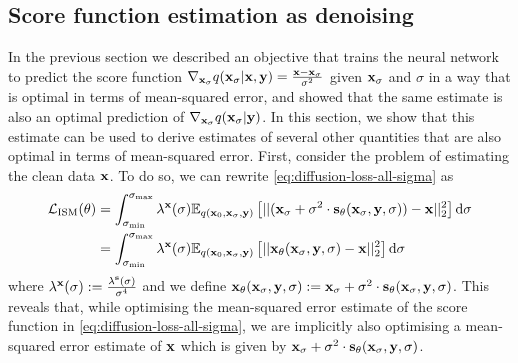 \subsection{Score function estimation as denoising} \label{eq:diffusion-equivalent-parameterisations}
In the previous section we described an objective that trains the neural network to predict the score function $\nabla_{{\mathbf{x}}_\sigma} q({\mathbf{x}}_\sigma|{\mathbf{x}},{\mathbf{y}}) = \frac{{\mathbf{x}}-{\mathbf{x}}_\sigma}{\sigma^2}$ given ${\mathbf{x}}_\sigma$ and $\sigma$ in a way that is optimal in terms of mean-squared error, and showed that the same estimate is also an optimal prediction of $\nabla_{{\mathbf{x}}_\sigma} q({\mathbf{x}}_\sigma|{\mathbf{y}})$. In this section, we show that this estimate can be used to derive estimates of several other quantities that are also optimal in terms of mean-squared error. First, consider the problem of estimating the clean data ${\mathbf{x}}$. To do so, we can rewrite \cref{eq:diffusion-loss-all-sigma} as
\begin{align} \label{eq:x0-diffusion-loss}
    \mathcal{L}_\text{ISM}(\theta) &= \int_{\sigma_\text{min}}^{\sigma_\text{max}} \lambda^{\mathbf{x}}(\sigma) \mathbb{E}_{q({\mathbf{x}}_0, {\mathbf{x}}_\sigma, {\mathbf{y}})} \left[ 
    || ({\mathbf{x}}_\sigma + \sigma^2 \cdot {\mathbf{s}}_\theta({\mathbf{x}}_\sigma, {\mathbf{y}}, \sigma)) - {\mathbf{x}} ||_2^2 \right] \mathrm{d}\sigma \\
    &= \int_{\sigma_\text{min}}^{\sigma_\text{max}} \lambda^{\mathbf{x}}(\sigma) \mathbb{E}_{q({\mathbf{x}}_0, {\mathbf{x}}_\sigma, {\mathbf{y}})} \left[ 
    || {\mathbf{x}}_\theta({\mathbf{x}}_\sigma, {\mathbf{y}}, \sigma) - {\mathbf{x}} ||_2^2 \right] \mathrm{d}\sigma
\end{align}
where $\lambda^{\mathbf{x}}(\sigma) := \frac{\lambda^{\mathbf{s}}(\sigma)}{\sigma^4}$ and we define ${\mathbf{x}}_\theta({\mathbf{x}}_\sigma, {\mathbf{y}}, \sigma) := {\mathbf{x}}_\sigma + \sigma^2 \cdot {\mathbf{s}}_\theta({\mathbf{x}}_\sigma, {\mathbf{y}}, \sigma)$. This reveals that, while optimising the mean-squared error estimate of the score function in \cref{eq:diffusion-loss-all-sigma}, we are implicitly also optimising a mean-squared error estimate of ${\mathbf{x}}$ which is given by ${\mathbf{x}}_\sigma + \sigma^2 \cdot {\mathbf{s}}_\theta({\mathbf{x}}_\sigma, {\mathbf{y}}, \sigma)$.

